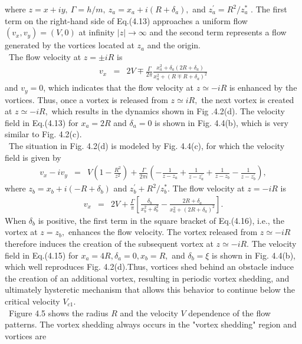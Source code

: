 \documentclass[12pt,a4paper]{report} %
\begin{document}
where $z = x + iy, \ \Gamma = h/m, \ z_a = x_a + i(R + \delta_a),$
and $z^\prime_a = R^2/z^*_a$ \cite{56}.
The first term on the right-hand side of Eq.(4.13)
approaches a uniform flow $(v_x, v_y)=(V,0)$ at 
infinity $|z| \rightarrow \infty$ and the second term 
represents a flow generated by the vortices located at
$z_a$ and the origin.
\\
\ The flow velocity at $z = \pm iR$ is
\begin{eqnarray}
v_x & = & 2V \mp \frac{\Gamma}{2 \pi}
\frac{x^2_a + \delta_a(2R+\delta_a)}{x^2_a + (R \mp R + \delta_a)^2}
\end{eqnarray}
and $v_y = 0$, which indicates that the flow velocity at
$z \simeq -iR$ is enhanced by the vortices. Thus, once a vortex
is released from $z \simeq iR,$ the next vortex is created at
$z \simeq -iR,$ which results in the dynamics shown in Fig .4.2(d).
The velocity field in Eq.(4.13) for $x_a = 2R$ and $\delta_a = 0$ is
shown in Fig. 4.4(b), which is very similar to Fig. 4.2(c).
\\
\ The situation in Fig. 4.2(d) is modeled by Fig. 4.4(c), for
which the velocity field is given by
\begin{eqnarray}
v_x - iv_y & = & V \left( 1 - \frac{R^2}{z^2} \right)
+ \frac{\Gamma}{2 \pi i} \left( - \frac{1}{z-z_a} + \frac{1}{z-z^\prime_a}
+ \frac{1}{z-z_b} - \frac{1}{z-z^\prime_b} \right),
\end{eqnarray}
where $z_b = x_b + i(-R+\delta_b)$ and $z^\prime_b + R^2/z^*_b$. The flow
velocity at $z=-iR$ is
\begin{eqnarray}
v_x & = & 2V + \frac{\Gamma}{\pi}
\left[
\frac{\delta_b}{x^2_b+\delta^2_b} - \frac{2R+\delta_a}{x^2_a+(2R+\delta_a)^2}
\right].
\end{eqnarray}
When $\delta_b$ is positive, the first term in the square bracket
of Eq.(4.16), i.e., the vortex at $z=z_b,$ enhances the flow
velocity. The vortex released from $z \simeq -iR$ therefore induces
the creation of the subsequent vortex at $z \simeq -iR$.
The velocity field in Eq.(4.15) for $x_a=4R,\delta_a=0,x_b=R,$
and $\delta_b=\xi$ is shown in Fig. 4.4(b), which well reproduces
Fig. 4.2(d).Thus, vortices shed behind an obstacle induce
the creation of an additional vortex, resulting in periodic
vortex shedding, and ultimately hysteretic mechanism
that allows this behavior to continue below the critical velocity $V_{c1}$.
\\
\ Figure 4.5 shows the radius $R$ and the velocity $V$ dependence
of the flow patterns. The vortex shedding always
occurs in the "vortex shedding" region and vortices are
\end{document}
